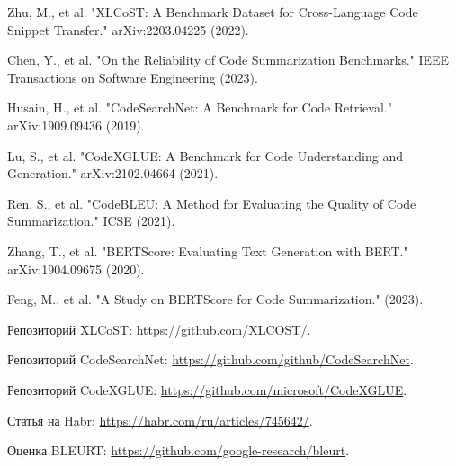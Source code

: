\documentclass[14pt]{article}
\theoremstyle{definition}
\begin{document}
\newpage
{}
\begin{thebibliography}{99}

Zhu, M., et al. "XLCoST: A Benchmark Dataset for Cross-Language Code Snippet Transfer." arXiv:2203.04225 (2022).

Chen, Y., et al. "On the Reliability of Code Summarization Benchmarks." IEEE Transactions on Software Engineering (2023).

Husain, H., et al. "CodeSearchNet: A Benchmark for Code Retrieval." arXiv:1909.09436 (2019).

Lu, S., et al. "CodeXGLUE: A Benchmark for Code Understanding and Generation." arXiv:2102.04664 (2021).

Ren, S., et al. "CodeBLEU: A Method for Evaluating the Quality of Code Summarization." ICSE (2021).

Zhang, T., et al. "BERTScore: Evaluating Text Generation with BERT." arXiv:1904.09675 (2020).

Feng, M., et al. "A Study on BERTScore for Code Summarization." (2023).

Репозиторий XLCoST: \url{https://github.com/XLCOST/}.

Репозиторий CodeSearchNet: \url{https://github.com/github/CodeSearchNet}.

Репозиторий CodeXGLUE: \url{https://github.com/microsoft/CodeXGLUE}.

Статья на Habr: \url{https://habr.com/ru/articles/745642/}.

Оценка BLEURT: \url{https://github.com/google-research/bleurt}.

\end{thebibliography}
\end{document}
